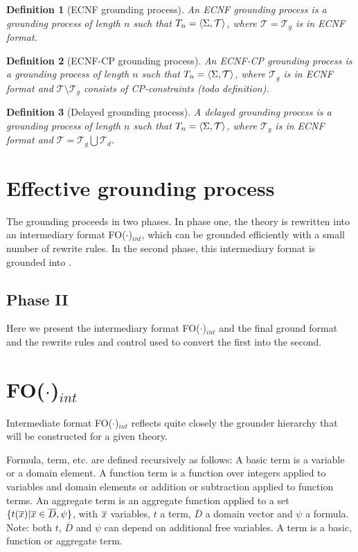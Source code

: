 \documentclass{article}
\newcommand{\seq}[1]{\left\langle#1\right\rangle}
\newcommand{\T}{\mathcal{T}}
\newcommand{\Tg}{\mathcal{T}_g}
\newcommand{\Td}{\mathcal{T}_d}
\newcommand{\pg}{\seq{\voc,\T}}
\newcommand{\indot}{{\sc FO($\cdot$)$_{int}$}\xspace}
\newcommand{\DDD}{\ensuremath{\overline{D}}}
\newtheorem{definition}{Definition}
\begin{document}
\begin{definition}[ECNF grounding process]
	An ECNF grounding process is a grounding process of length $n$ such that $T_n=\pg$, where $\T = \Tg$ is in ECNF format.
\end{definition}


\begin{definition}[ECNF-CP grounding process]
	An ECNF-CP grounding process is a grounding process of length $n$ such that $T_n=\pg$, where $\Tg$ is in ECNF format and $\T\setminus \Tg$ consists of CP-constraints (todo definition).
\end{definition}

\begin{definition}[Delayed grounding process]
	A delayed grounding process is a grounding process of length $n$ such that $T_n=\pg$, where $\Tg$ is in ECNF format and $\T = \Tg \bigcup \Td$.
\end{definition}


\section{Effective grounding process}
The grounding proceeds in two phases.
In phase one, the \fodot theory is rewritten into an intermediary format \indot, which can be grounded efficiently with a small number of rewrite rules. 
In the second phase, this intermediary format is grounded into \pcdot.

\subsection{Phase II}
Here we present the intermediary format \indot and the final ground format \pcdot and the rewrite rules and control used to convert the first into the second.

\section{\indot}
Intermediate format \indot reflects quite closely the grounder hierarchy that will be constructed for a given theory.

Formula, term, etc. are defined recursively as follows:
A basic term is a variable or a domain element.
A function term is a function over integers applied to variables and domain elements or addition or subtraction applied to function terms.
An aggregate term is an aggregate function applied to a set $\{t(\xxx) | \xxx \in \DDD, \psi\}$, with $\overline{x}$ variables, $t$ a term, $\DDD$ a domain vector and $\psi$ a formula. 
Note: both $t$, $\DDD$ and $\psi$ can depend on additional free variables.
A term is a basic, function or aggregate term.
\end{document}
